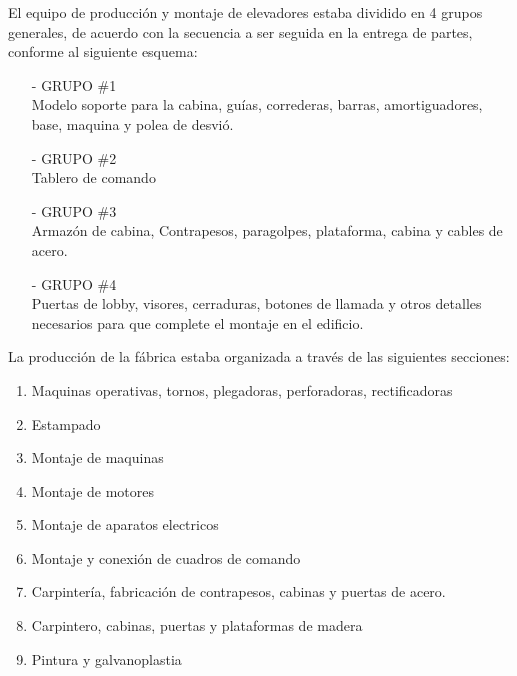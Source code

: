 \documentclass[a4paper,10pt,titlepage]{article}
\begin{document}
El equipo de producci\'on y montaje de elevadores estaba dividido en 4 grupos
generales, de acuerdo con la secuencia a ser seguida en la entrega de partes,
conforme al siguiente esquema:\\
\begin{itemize}
 \item[-] GRUPO \#1\\
Modelo soporte para la cabina, gu\'ias, correderas, barras, amortiguadores, base,
maquina y polea de desvi\'o.
\item[-] GRUPO \#2\\
Tablero de comando
\item[-] GRUPO \#3\\
Armaz\'on de cabina, Contrapesos, paragolpes, plataforma, cabina y cables de acero.
\item[-] GRUPO \#4\\
Puertas de lobby, visores, cerraduras, botones de llamada y otros detalles necesarios
para que complete el montaje en el edificio.
\end{itemize}

La producci\'on de la f\'abrica estaba organizada a trav\'es de las siguientes secciones:
\begin{enumerate}
 \item Maquinas operativas, tornos, plegadoras, perforadoras, rectificadoras
 \item Estampado
 \item Montaje de maquinas
 \item Montaje de motores
 \item Montaje de aparatos electricos
 \item Montaje y conexi\'on de cuadros de comando
 \item Carpinter\'ia, fabricaci\'on de contrapesos, cabinas y puertas de acero.
 \item Carpintero, cabinas, puertas y plataformas de madera
 \item Pintura y galvanoplastia
\end{enumerate}
\end{document}
